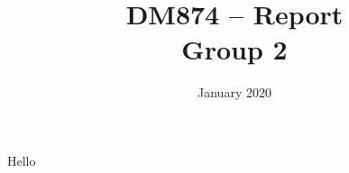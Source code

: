 \documentclass[12pt]{article}
\title{DM874 -- Report \\ Group 2}
\date{January 2020}
\begin{document}
\begin{titlepage}
    \begin{center}
        \vspace*{-2cm}\hspace*{1cm}
 
        \vspace{2.5cm}


        {\let\newpage\relax\maketitle}
        \thispagestyle{empty}

        \vspace{0.8cm}

        \begin{minipage}{.8\textwidth}
        Hello
        \end{minipage}

    \end{center}
\end{titlepage}


\newpage

\setcounter{tocdepth}{2}
\tableofcontents
\newpage














\clearpage

\newpage
\end{document}
